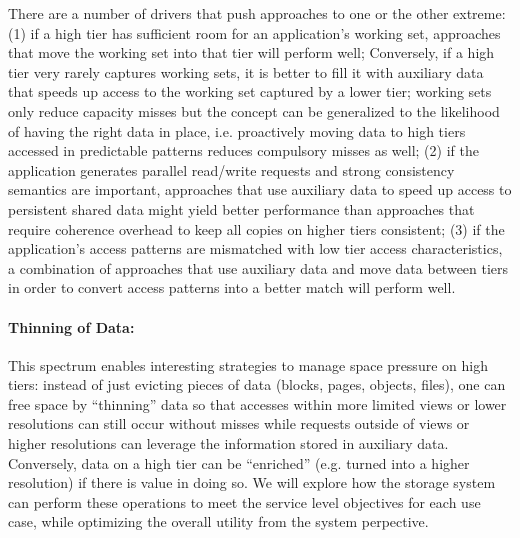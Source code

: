 There are a
number of drivers that push approaches to one or the other extreme:
(1) if a high tier has sufficient room for an application's working
set, approaches that move the working set into that tier will perform
well; Conversely, if a high tier very rarely captures working sets,
it is better to fill it with auxiliary data that speeds up access
to the working set captured by a lower tier; working sets only
reduce capacity misses but the concept can be generalized to the
likelihood of having the right data in place, i.e. proactively
moving data to high tiers accessed in predictable patterns reduces
compulsory misses as well; (2) if the application generates parallel
read/write requests and strong consistency semantics are important,
approaches that use auxiliary data to speed up access to persistent
shared data might yield better performance than approaches that
require coherence overhead to keep all copies on higher tiers
consistent; (3) if the application's access patterns are mismatched
with low tier access characteristics, a combination of approaches
that use auxiliary data and move data between tiers in order to
convert access patterns into a better match will perform well.

\paragraph{Thinning of Data:} 
This spectrum enables interesting strategies
to manage space pressure on high tiers: instead of just evicting
pieces of data (blocks, pages, objects, files), one can free space
by ``thinning'' data so that accesses within more limited views or
lower resolutions can still occur without misses while requests
outside of views or higher resolutions can leverage the information
stored in auxiliary data. Conversely, data on a high tier can be
``enriched'' (e.g. turned into a higher resolution) if there is
value in doing so. We will explore how the storage system can perform these
operations to meet the service level objectives for each use case, while
optimizing the overall utility from the system perpective. 

